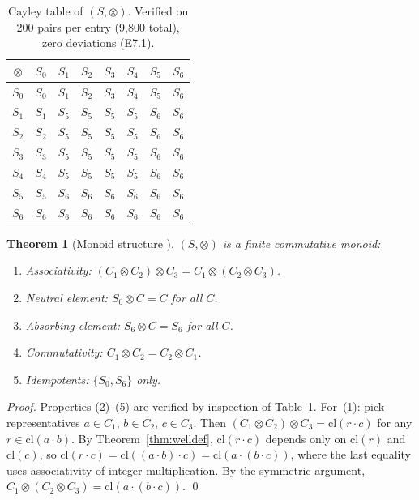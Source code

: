 \documentclass[10pt,twocolumn]{article}
\newtheorem{theorem}{Theorem}[section]
\newcommand{\cl}{\mathrm{cl}}
\begin{document}
\begin{table}[htbp]
\centering
\caption{Cayley table of $(S, \otimes)$. Verified on 200 pairs per
         entry (9{,}800 total), zero deviations (E7.1).}\label{tab:cayley}
\small
\setlength{\tabcolsep}{5pt}
\begin{tabular}{c|ccccccc}
\toprule
$\otimes$ & $S_0$ & $S_1$ & $S_2$ & $S_3$ & $S_4$ & $S_5$ & $S_6$ \\
\midrule
$S_0$ & $S_0$ & $S_1$ & $S_2$ & $S_3$ & $S_4$ & $S_5$ & $S_6$ \\
$S_1$ & $S_1$ & $S_5$ & $S_5$ & $S_5$ & $S_5$ & $S_6$ & $S_6$ \\
$S_2$ & $S_2$ & $S_5$ & $S_5$ & $S_5$ & $S_5$ & $S_6$ & $S_6$ \\
$S_3$ & $S_3$ & $S_5$ & $S_5$ & $S_5$ & $S_5$ & $S_6$ & $S_6$ \\
$S_4$ & $S_4$ & $S_5$ & $S_5$ & $S_5$ & $S_5$ & $S_6$ & $S_6$ \\
$S_5$ & $S_5$ & $S_6$ & $S_6$ & $S_6$ & $S_6$ & $S_6$ & $S_6$ \\
$S_6$ & $S_6$ & $S_6$ & $S_6$ & $S_6$ & $S_6$ & $S_6$ & $S_6$ \\
\bottomrule
\end{tabular}
\end{table}

\begin{theorem}[Monoid structure {\cite{CliffordPreston1961}}]\label{thm:monoid}
$(S, \otimes)$ is a finite commutative monoid:
\begin{enumerate}[noitemsep, topsep=2pt]
\item \emph{Associativity:}
      $(C_1 \otimes C_2) \otimes C_3 = C_1 \otimes (C_2 \otimes C_3)$.
\item \emph{Neutral element:} $S_0 \otimes C = C$ for all $C$.
\item \emph{Absorbing element:} $S_6 \otimes C = S_6$ for all $C$.
\item \emph{Commutativity:} $C_1 \otimes C_2 = C_2 \otimes C_1$.
\item \emph{Idempotents:} $\{S_0, S_6\}$ only.
\end{enumerate}
\end{theorem}
\begin{proof}
Properties (2)--(5) are verified by inspection of
Table~\ref{tab:cayley}. For~(1): pick representatives $a \in C_1$,
$b \in C_2$, $c \in C_3$. Then
$(C_1 \otimes C_2) \otimes C_3 = \cl(r \cdot c)$ for any
$r \in \cl(a \cdot b)$. By Theorem~\ref{thm:welldef}, $\cl(r \cdot c)$
depends only on $\cl(r)$ and $\cl(c)$, so
$\cl(r \cdot c) = \cl((a \cdot b) \cdot c) = \cl(a \cdot (b \cdot c))$,
where the last equality uses associativity of integer multiplication.
By the symmetric argument, $C_1 \otimes (C_2 \otimes C_3) = \cl(a \cdot (b \cdot c))$. \qed
\end{proof}
\end{document}
